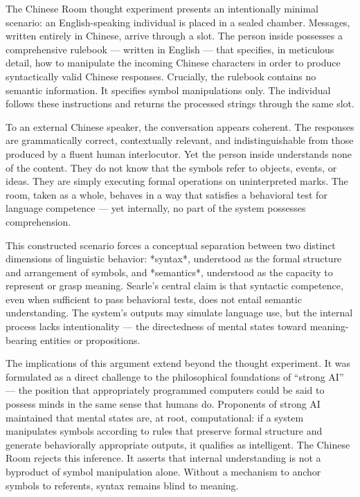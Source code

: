 The Chinese Room thought experiment presents an intentionally minimal scenario: an English-speaking individual is placed in a sealed chamber. Messages, written entirely in Chinese, arrive through a slot. The person inside possesses a comprehensive rulebook — written in English — that specifies, in meticulous detail, how to manipulate the incoming Chinese characters in order to produce syntactically valid Chinese responses. Crucially, the rulebook contains no semantic information. It specifies symbol manipulations only. The individual follows these instructions and returns the processed strings through the same slot.

To an external Chinese speaker, the conversation appears coherent. The responses are grammatically correct, contextually relevant, and indistinguishable from those produced by a fluent human interlocutor. Yet the person inside understands none of the content. They do not know that the symbols refer to objects, events, or ideas. They are simply executing formal operations on uninterpreted marks. The room, taken as a whole, behaves in a way that satisfies a behavioral test for language competence — yet internally, no part of the system possesses comprehension.

This constructed scenario forces a conceptual separation between two distinct dimensions of linguistic behavior: *syntax*, understood as the formal structure and arrangement of symbols, and *semantics*, understood as the capacity to represent or grasp meaning. Searle’s central claim is that syntactic competence, even when sufficient to pass behavioral tests, does not entail semantic understanding. The system’s outputs may simulate language use, but the internal process lacks intentionality — the directedness of mental states toward meaning-bearing entities or propositions.

The implications of this argument extend beyond the thought experiment. It was formulated as a direct challenge to the philosophical foundations of “strong AI” — the position that appropriately programmed computers could be said to possess minds in the same sense that humans do. Proponents of strong AI maintained that mental states are, at root, computational: if a system manipulates symbols according to rules that preserve formal structure and generate behaviorally appropriate outputs, it qualifies as intelligent. The Chinese Room rejects this inference. It asserts that internal understanding is not a byproduct of symbol manipulation alone. Without a mechanism to anchor symbols to referents, syntax remains blind to meaning.

